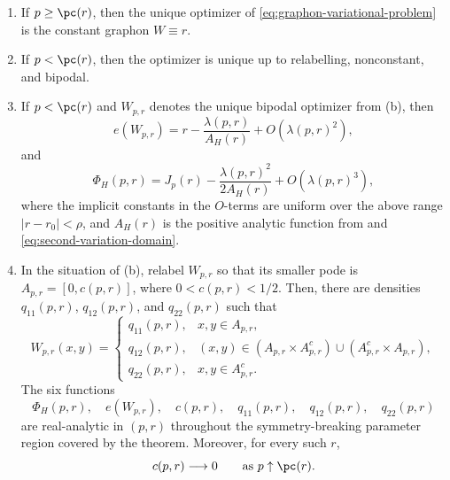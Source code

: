 \begin{theorem}
\begin{enumerate}[label=(\alph*)]
  \item If $p\ge\pc(r)$, then the unique optimizer of
  \eqref{eq:graphon-variational-problem} is the constant graphon $W\equiv r$.
  \item If $p<\pc(r)$, then the optimizer is unique up to relabelling,
  nonconstant, and bipodal.
  \item If $p<\pc(r)$ and $W_{p,r}$ denotes the unique bipodal optimizer from
  (b), then
  \begin{equation}\label{eq:optimizer-edge-expansion}
    e(W_{p,r})=r-\frac{\lambda(p,r)}{A_H(r)}+O(\lambda(p,r)^2),
  \end{equation}
  and
  \begin{equation}\label{eq:optimal-value-expansion}
    \Phi_H(p,r)=J_p(r)-\frac{\lambda(p,r)^2}{2A_H(r)}+O(\lambda(p,r)^3),
  \end{equation}
  where the implicit constants in the \(O\)-terms are uniform over the above
  range \(|r-r_0|<\rho\), and \(A_H(r)\) is the positive analytic function
  from  and \eqref{eq:second-variation-domain}.
  \item In the situation of \textup{(b)}, relabel $W_{p,r}$ so that its
  smaller pode is $A_{p,r}=[0,c(p,r)]$, where $0<c(p,r)<1/2$.  Then, there are
  densities $q_{11}(p,r)$, $q_{12}(p,r)$, and $q_{22}(p,r)$ such that
  \[
    W_{p,r}(x,y)=
    \begin{cases}
      q_{11}(p,r),
        & x,y\in A_{p,r},\\
      q_{12}(p,r),
        & (x,y)\in
          (A_{p,r}\times A_{p,r}^c)
          \cup(A_{p,r}^c\times A_{p,r}),\\
      q_{22}(p,r),
        & x,y\in A_{p,r}^c.
    \end{cases}
  \]
  The six functions
  \[
    \Phi_H(p,r),\quad e(W_{p,r}),\quad c(p,r),\quad
    q_{11}(p,r),\quad q_{12}(p,r),\quad q_{22}(p,r)
  \]
  are real-analytic in $(p,r)$ throughout the symmetry-breaking parameter
  region covered by the theorem.  Moreover, for every such $r$,
  \[
    c(p,r)\longrightarrow0
    \qquad\text{as }p\uparrow\pc(r).
  \]
\end{enumerate}
\end{theorem}

